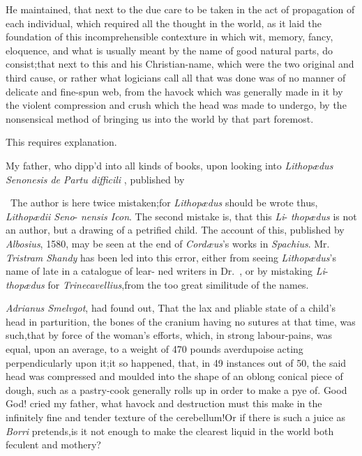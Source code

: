 \documentclass{article}
\begin{document}
He maintained, that next to the due care to be taken in the act
of propagation of each individual, which required all the thought
in the world, as it laid the foundation of this incomprehensible
contexture in which wit, memory, fancy, eloquence, and what is
usually meant by the name of good natural parts, do
consist;\tsk that next to this and his Christian-name, which were
the two original and
third cause, or rather what logicians
call 
all that was done was of no manner of 
delicate and fine-spun web, from the ha\-vock
which was generally made in it by
the violent compression and crush
which the head was made to undergo, by the nonsensical method of
bringing us into the world by that part foremost.

\tsh This requires explanation.

My father, who dipp’d into all kinds of books, upon looking into \textit{Lithopædus
Senonesis de Partu difficili} \fnast, published by\break
{}

\vfill

\bgroup\fontsize{8}{11}\selectfont\indent\fnast\ 
The author is here twice mistaken;\tsh for\break
\textit{Lithopædus} should be wrote thus, \textit{Lithopædii Seno}-\break
\textit{nensis Icon}. The second mistake is, that this \textit{Li}-\break
\textit{thopædus} is not an author, but a drawing of a\break
petrified child. The account of this, published\break
by \textit{Albosius}, 1580, may be seen at the end of\break
\textit{Cordæus}’s works in \textit{Spachius}. Mr.\,\textit{Tristram Shandy}\break
has been led into this error, either from seeing\break
\textit{Lithopædus}’s name of late in a catalogue of lear-\break
ned writers in \hbox{Dr. \tsh}, or by mistaking \textit{Li}-\break
\textit{thopædus} for \textit{Trinecavellius},\tsk from the too great\break
similitude of the names.\par\egroup

\vfill
\newpage\noindent
\textit{Adrianus Smelvgot}, had found out, That\break
the lax and pliable state of a child’s\break
head in parturition, the bones of the\break
cranium having no sutures at that time,\break
was such,\tsk that by force of the woman’s\break
efforts, which, in strong labour-pains,\break
was equal, upon an average, to a
weight of 470 pounds averdupoise acting perpendicularly upon it;\tsk it so happened,
that, in 49 instances out of 50, the said head was compressed and moulded into the
shape of an oblong conical piece of dough, such as a pastry-cook generally rolls up
in order to make a pye of.\tsh\break
Good God!  cried my father, what ha\-vock and destruction
must this make in the infinitely fine and tender texture of the cerebellum!\tsk Or if
there is such a juice as \textit{Borri} pretends,\tsk is it not enough to make the
clearest liquid in the world both feculent and
mothery?
\end{document}
